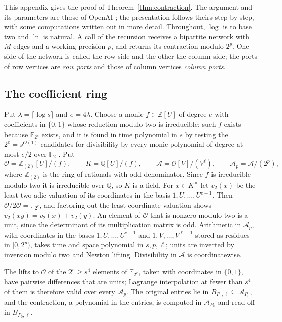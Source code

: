 \documentclass[11pt,reqno]{amsart}
\numberwithin{equation}{section}
\theoremstyle{plain}
\theoremstyle{definition}
\theoremstyle{remark}
\newcommand{\Z}{\mathbb{Z}}
\newcommand{\Q}{\mathbb{Q}}
\newcommand{\F}{\mathbb{F}}
\newcommand{\cO}{\mathcal{O}}
\newcommand{\cA}{\mathcal{A}}
\newcommand{\oai}{OpenAI}
\newcommand{\vtwo}{v_2}
\begin{document}
This appendix gives the proof of Theorem~\ref{thm:contraction}. The argument
and its parameters are those of \oai{} \cite[Appendix D.4]{OAI26}; the
presentation follows theirs step by step, with some computations written out
in more detail. Throughout, $\log$ is to base two and $\ln$ is natural. A call
of the recursion receives a bipartite network with $M$ edges and a working
precision $p$, and returns its contraction modulo $2^p$. One side of the
network is called the row side and the other the column side; the ports of
row vertices are \emph{row ports} and those of column vertices \emph{column
ports}.

\subsection{The coefficient ring}\label{app:ring}
Put $\lambda=\lceil\log s\rceil$ and $e=4\lambda$. Choose a monic $f\in\Z[U]$ of
degree $e$ with coefficients in $\{0,1\}$ whose reduction modulo two is
irreducible; such $f$ exists because $\F_{2^e}$ exists, and it is found in time
polynomial in $s$ by testing the $2^e=s^{O(1)}$ candidates for divisibility by
every monic polynomial of degree at most $e/2$ over $\F_2$ \cite{vzGG13}. Put
\[
\cO=\Z_{(2)}[U]/(f),\qquad K=\Q[U]/(f),\qquad \cA=\cO[V]/(V^\ell),\qquad
\cA_p=\cA/(2^p),
\]
where $\Z_{(2)}$ is the ring of rationals with odd denominator. Since $f$ is
irreducible modulo two it is irreducible over $\Q$, so $K$ is a field. For
$x\in K^\times$ let $\vtwo(x)$ be the least two-adic valuation of its coordinates
in the basis $1,U,\dots,U^{e-1}$. Then $\cO/2\cO=\F_{2^e}$, and factoring out the
least coordinate valuation shows $\vtwo(xy)=\vtwo(x)+\vtwo(y)$. An element of
$\cO$ that is nonzero modulo two is a unit, since the determinant of its
multiplication matrix is odd. Arithmetic in $\cA_p$, with coordinates in the
bases $1,U,\dots,U^{e-1}$ and $1,V,\dots,V^{\ell-1}$ stored as residues in
$[0,2^p)$, takes time and space polynomial in $s,p,\ell$; units are inverted by
inversion modulo two and Newton lifting. Divisibility in $\cA$ is coordinatewise.

The lifts to $\cO$ of the $2^e\ge s^4$ elements of $\F_{2^e}$, taken with
coordinates in $\{0,1\}$, have pairwise differences that are units; Lagrange
interpolation at fewer than $s^4$ of them is therefore valid over every
$\cA_p$. The original entries lie in $B_{P_0,\ell}\subseteq\cA_{P_0}$, and the
contraction, a polynomial in the entries, is computed in $\cA_{P_0}$ and read off
in $B_{P_0,\ell}$.
\end{document}
